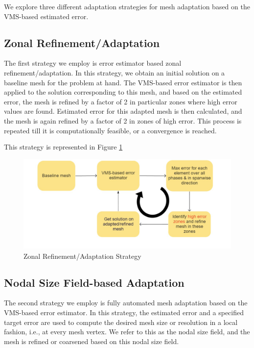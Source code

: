 We explore three different adaptation strategies for mesh adaptation based on the VMS-based estimated error. 

\subsection{Zonal Refinement/Adaptation}

The first strategy we employ is error estimator based zonal refinement/adaptation. 
In this strategy, we obtain an initial solution on a baseline mesh for the problem at hand. The VMS-based error estimator is then applied to the solution corresponding to this mesh, and based on the estimated error, the mesh is refined by a factor of 2 in particular zones where high error values are found. Estimated error for this adapted mesh is then calculated, and the mesh is again refined by a factor of 2 in zones of high error. This process is repeated till it is computationally feasible, or a convergence is reached.

This strategy is represented in Figure \ref{fig:zonal_based_strat}

\begin{figure}[H]
	\centering
	\includegraphics[width=1\textwidth]{figures/adapt_strat/zonal_based.png}
	\caption{Zonal Refinement/Adaptation Strategy}
	\label{fig:zonal_based_strat}
\end{figure}

\subsection{Nodal Size Field-based Adaptation}

The second strategy we employ is fully automated mesh adaptation based on the VMS-based error estimator. In this strategy, the estimated error and a specified target error are used to compute the desired mesh size or resolution in a local fashion, i.e., at every mesh vertex. We refer to this as the nodal size field, and the mesh is refined or coarsened based on this nodal size field. 

